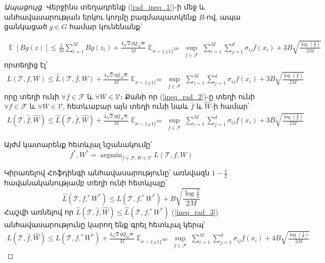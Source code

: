 \documentclass[12pt]{article}
\DeclareMathOperator*{\argmin}{argmin}
\DeclareMathOperator*{\E}{\mathbb{E}}
\begin{document}
\begin{proof}[Ապացույց]
Վերջինս տեղադրենք (\ref{rad_ineq_1})-ի մեջ և անհավասարության երկու կողմը բազմապատկենք $B$-ով, ապա ցանկացած $g \in G$ համար կունենանք՝

\begin{align*}
\E[Bg(z)] \leq \frac{1}{M}\sum_{i=1}^MBg(z_i) + \frac{4\sqrt{2} \eta Q\sqrt{n}}{M} \E_{\sigma \sim \{\pm1\}^{Md}} \sup_{\substack{ f  \in \mathcal{F}  }}\sum_{i=1}^M \sum_{j=1}^d \sigma_{ij}f(x_i)+    3B\sqrt{\frac{\log \left( \frac{4}{\delta} \right)}{2M}}
\end{align*}
որտեղից էլ՝
\begin{align}
\label{ineq_rad_2}
L(\mathcal{T}, f, W) \leq \hat{L}(\mathcal{T}, f, W) + \frac{4\sqrt{2} \eta Q\sqrt{n}}{M} \E_{\sigma \sim \{\pm1\}^{Md}} \sup_{\substack{ f  \in \mathcal{F}  }}\sum_{i=1}^M \sum_{j=1}^d \sigma_{ij}f(x_i)+    3B\sqrt{\frac{\log \left( \frac{4}{\delta} \right)}{2M}}
\end{align}
որը տեղի ունի $\forall f \in \mathcal{ F}$ և $\forall W \in \mathcal{V}$։ Քանի որ  (\ref{ineq_rad_2})-ը տեղի ունի $\forall f \in \mathcal{ F}$ և $\forall W \in \mathcal{V}$, հետևաբար այն տեղի ունի նաև $\hat{f}$ և $\hat{W}$-ի համար՝
\begin{align}
\label{ineq_rad_3}
L(\mathcal{T}, \hat{f}, \hat{W}) \leq \hat{L}(\mathcal{T}, \hat{f}, \hat{W}) + \frac{4\sqrt{2} \eta Q\sqrt{n}}{M} \E_{\sigma \sim \{\pm1\}^{Md}} \sup_{\substack{ f  \in \mathcal{F}  }}\sum_{i=1}^M \sum_{j=1}^d \sigma_{ij}f(x_i)+    3B\sqrt{\frac{\log \left( \frac{4}{\delta} \right)}{2M}}
\end{align}

Այժմ կատարենք հետևյալ նշանակումը՝ $$f^*, W^* = \argmin_{f \in \mathcal{F}, W \in \mathcal{V}}L(\mathcal{T}, f, W)$$ \par Կիրառելով Հոֆդինգի անհավասարությունը՝ առնվազն $1- \frac{\delta}{2}$ հավանականությամբ տեղի ունի հետևյալը՝
$$\hat{L}(\mathcal{T}, f,^* W^*) \leq L(\mathcal{T}, f,^* W^*) + B\sqrt{\frac{\log\frac{2}{\delta}}{2M}}$$
Հաշվի առնելով որ $\hat{L}(\mathcal{T}, \hat{f}, \hat{W})  \leq \hat{L}(\mathcal{T}, f,^* W^*) $  (\ref{ineq_rad_3}) անհավասարությունը կարող ենք գրել հետևյալ կերպ՝
\begin{align}
\label{ineq_rad_4}
L(\mathcal{T}, \hat{f}, \hat{W}) \leq  L(\mathcal{T}, f,^* W^*) + \frac{4\sqrt{2} \eta Q\sqrt{n}}{M} \E_{\sigma \sim \{\pm1\}^{Md}} \sup_{\substack{ f  \in \mathcal{F}  }}\sum_{i=1}^M \sum_{j=1}^d \sigma_{ij}f(x_i)+    4B\sqrt{\frac{\log \left( \frac{4}{\delta} \right)}{2M}}
\end{align}


\end{proof}
\end{document}
